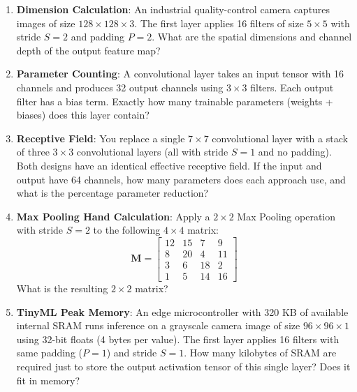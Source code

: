 \begin{checkyourself}
\begin{enumerate}
    \item \textbf{Dimension Calculation}: An industrial quality-control camera captures images of size $128 \times 128 \times 3$. The first layer applies 16 filters of size $5 \times 5$ with stride $S = 2$ and padding $P = 2$. What are the spatial dimensions and channel depth of the output feature map?
    \item \textbf{Parameter Counting}: A convolutional layer takes an input tensor with 16 channels and produces 32 output channels using $3 \times 3$ filters. Each output filter has a bias term. Exactly how many trainable parameters (weights + biases) does this layer contain?
    \item \textbf{Receptive Field}: You replace a single $7 \times 7$ convolutional layer with a stack of three $3 \times 3$ convolutional layers (all with stride $S=1$ and no padding). Both designs have an identical effective receptive field. If the input and output have 64 channels, how many parameters does each approach use, and what is the percentage parameter reduction?
    \item \textbf{Max Pooling Hand Calculation}: Apply a $2 \times 2$ Max Pooling operation with stride $S=2$ to the following $4 \times 4$ matrix:
    \begin{equation*}
    \mathbf{M} = \begin{bmatrix}
    12 & 15 & 7 & 9 \\
    8  & 20 & 4 & 11 \\
    3  & 6  & 18 & 2 \\
    1  & 5  & 14 & 16
    \end{bmatrix}
    \end{equation*}
    What is the resulting $2 \times 2$ matrix?
    \item \textbf{TinyML Peak Memory}: An edge microcontroller with 320 KB of available internal SRAM runs inference on a grayscale camera image of size $96 \times 96 \times 1$ using 32-bit floats (4 bytes per value). The first layer applies 16 filters with same padding ($P=1$) and stride $S=1$. How many kilobytes of SRAM are required just to store the output activation tensor of this single layer? Does it fit in memory?
\end{enumerate}
\end{checkyourself}

